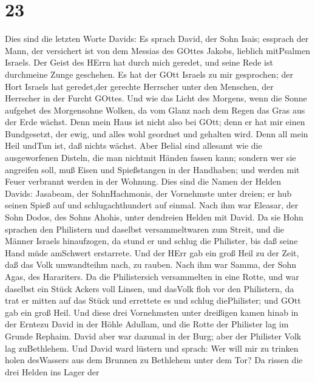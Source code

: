 \hypertarget{section-22}{%
\section{23}\label{section-22}}

 Dies sind die letzten Worte Davids: Es sprach David, der
Sohn Isais; essprach der Mann, der versichert ist von dem Messias des
GOttes Jakobs, lieblich mitPsalmen Israels.  Der Geist des
HErrn hat durch mich geredet, und seine Rede ist durchmeine Zunge
geschehen.  Es hat der GOtt Israels zu mir gesprochen; der
Hort Israels hat geredet,der gerechte Herrscher unter den Menschen, der
Herrscher in der Furcht GOttes.  Und wie das Licht des
Morgens, wenn die Sonne aufgehet des Morgensohne Wolken, da vom Glanz
nach dem Regen das Gras aus der Erde wächst.  Denn mein Haus
ist nicht also bei GOtt; denn er hat mir einen Bundgesetzt, der ewig,
und alles wohl geordnet und gehalten wird. Denn all mein Heil undTun
ist, daß nichts wächst.  Aber Belial sind allesamt wie die
ausgeworfenen Disteln, die man nichtmit Händen fassen kann; 
sondern wer sie angreifen soll, muß Eisen und Spießstangen in der
Handhaben; und werden mit Feuer verbrannt werden in der Wohnung.
 Dies sind die Namen der Helden Davids: Jasabeam, der
SohnHachmonis, der Vornehmste unter dreien; er hub seinen Spieß auf und
schlugachthundert auf einmal.  Nach ihm war Eleasar, der
Sohn Dodos, des Sohns Ahohis, unter dendreien Helden mit David. Da sie
Hohn sprachen den Philistern und daselbst versammeltwaren zum Streit,
und die Männer Israels hinaufzogen,  da stund er und schlug
die Philister, bis daß seine Hand müde amSchwert erstarrete. Und der
HErr gab ein groß Heil zu der Zeit, daß das Volk umwandteihm nach, zu
rauben.  Nach ihm war Samma, der Sohn Agas, des Harariters.
Da die Philistersich versammelten in eine Rotte, und war daselbst ein
Stück Ackers voll Linsen, und dasVolk floh vor den Philistern,
 da trat er mitten auf das Stück und errettete es und
schlug diePhilister; und GOtt gab ein groß Heil.  Und diese
drei Vornehmsten unter dreißigen kamen hinab in der Erntezu David in der
Höhle Adullam, und die Rotte der Philister lag im Grunde Rephaim.
 David aber war dazumal in der Burg; aber der Philister
Volk lag zuBethlehem.  Und David ward lüstern und sprach:
Wer will mir zu trinken holen desWassers aus dem Brunnen zu Bethlehem
unter dem Tor?  Da rissen die drei Helden ins Lager der
